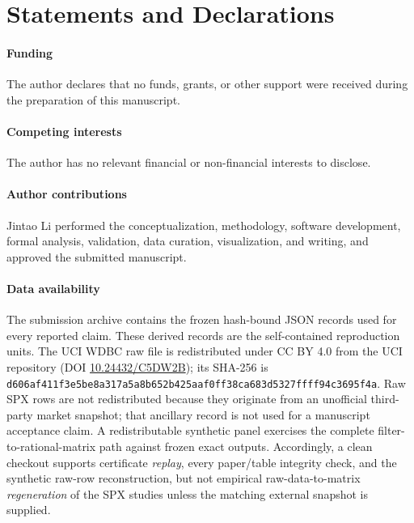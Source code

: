 \documentclass[smallextended]{svjour3}
\begin{document}



\section*{Statements and Declarations}

\paragraph{Funding}
The author declares that no funds, grants, or other support were received
during the preparation of this manuscript.

\paragraph{Competing interests}
The author has no relevant financial or non-financial interests to disclose.

\paragraph{Author contributions}
Jintao Li performed the conceptualization, methodology, software development,
formal analysis, validation, data curation, visualization, and writing, and
approved the submitted manuscript.

\paragraph{Data availability}
The submission archive contains the frozen hash-bound JSON records used for
every reported claim.  These derived records are the self-contained
reproduction units.  The UCI WDBC raw file is redistributed under CC BY 4.0
from the UCI repository (DOI
\href{https://doi.org/10.24432/C5DW2B}{10.24432/C5DW2B}); its SHA-256 is
\nolinkurl{d606af411f3e5be8a317a5a8b652b425aaf0ff38ca683d5327ffff94c3695f4a}.
Raw SPX rows are
not redistributed because they originate from an unofficial third-party
market snapshot; that ancillary record is not used for a manuscript acceptance
claim.  A redistributable synthetic panel exercises the complete
filter-to-rational-matrix path against frozen exact outputs.  Accordingly, a
clean checkout supports certificate \emph{replay}, every paper/table integrity
check, and the synthetic raw-row reconstruction, but not empirical
raw-data-to-matrix \emph{regeneration} of the SPX studies unless the matching
external snapshot is supplied.
\end{document}
